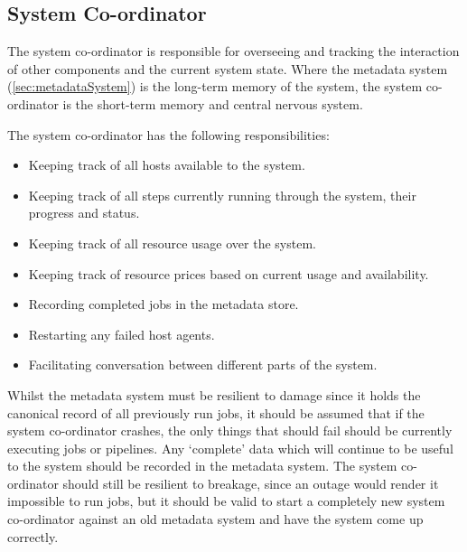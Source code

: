 \documentclass[10pt,a4paper]{article}
\newcommand{\npar}{\par\noindent\space}
\begin{document}
\subsection{System Co-ordinator}
\npar The system co-ordinator is responsible for overseeing and tracking the interaction of other components and the current system state. Where the metadata system (\ref{sec:metadataSystem}) is the long-term memory of the system, the system co-ordinator is the short-term memory and central nervous system.
\npar The system co-ordinator has the following responsibilities:
\begin{itemize}
\item Keeping track of all hosts available to the system.
\item Keeping track of all steps currently running through the system, their progress and status.
\item Keeping track of all resource usage over the system.
\item Keeping track of resource prices based on current usage and availability.
\item Recording completed jobs in the metadata store.
\item Restarting any failed host agents.
\item Facilitating conversation between different parts of the system.
\end{itemize}
\npar Whilst the metadata system must be resilient to damage since it holds the canonical record of all previously run jobs, it should be assumed that if the system co-ordinator crashes, the only things that should fail should be currently executing jobs or pipelines. Any `complete' data which will continue to be useful to the system should be recorded in the metadata system. The system co-ordinator should still be resilient to breakage, since an outage would render it impossible to run jobs, but it should be valid to start a completely new system co-ordinator against an old metadata system and have the system come up correctly.
\end{document}
